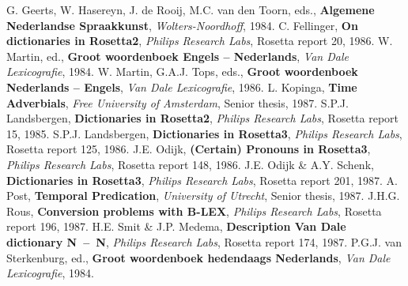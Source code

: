 \newpage
\begin{thebibliography}{AAA99a}
  G. Geerts, W. Hasereyn, J. de Rooij, M.C. van den 
  Toorn, eds., {\bf Algemene Nederlandse Spraakkunst}, {\em Wolters-Noordhoff},
  1984.
  C. Fellinger, {\bf On dictionaries in Rosetta2},
  {\em Philips Research Labs}, Rosetta report 20, 1986.
  W. Martin, ed., {\bf Groot woordenboek 
  Engels -- Nederlands}, {\em Van Dale Lexicografie}, 1984.
  W. Martin, G.A.J. Tops, eds., {\bf Groot woordenboek 
  Nederlands -- Engels}, {\em Van Dale Lexicografie}, 1986.
  L. Kopinga, {\bf Time Adverbials}, {\em
  Free University of Amsterdam}, Senior thesis, 1987.
  S.P.J. Landsbergen, {\bf Dictionaries in Rosetta2},
  {\em Philips Research Labs}, Rosetta report 15, 1985.
  S.P.J. Landsbergen, {\bf Dictionaries in Rosetta3},
  {\em Philips Research Labs}, Rosetta report 125, 1986.
  J.E. Odijk, {\bf (Certain) Pronouns in Rosetta3},
  {\em Philips Research Labs}, Rosetta report 148, 1986.
  J.E. Odijk \& A.Y. Schenk, {\bf Dictionaries in 
  Rosetta3}, {\em Philips Research Labs}, Rosetta report 201, 1987.
  A. Post, {\bf Temporal Predication}, {\em
  University of Utrecht}, Senior thesis, 1987.
  J.H.G. Rous, {\bf Conversion problems with B-LEX},
  {\em Philips Research Labs}, Rosetta report 196, 1987.
  H.E. Smit \& J.P. Medema, {\bf Description Van 
  Dale dictionary N~--~N}, {\em Philips Research Labs}, Rosetta report 174,
  1987.
  P.G.J. van Sterkenburg, ed., {\bf Groot woordenboek 
  hedendaags Nederlands}, {\em Van Dale Lexicografie}, 1984.
\end{thebibliography}
 

